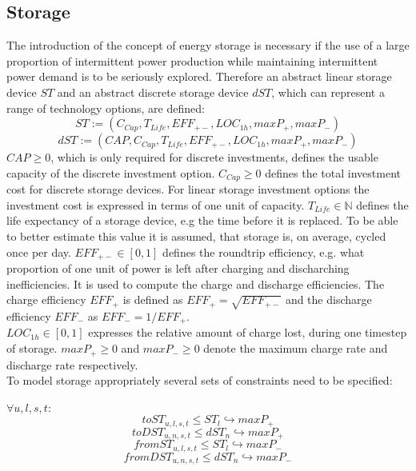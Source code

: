 \documentclass[
	11pt,								%
	DIV10,								%
	a4paper,         					%
	oneside,							%
	headheight=20pt,					%
	footheight=20pt,					%
    parskip=full,						%
    listof=totoc,						%
	bibliography=totoc,					%
	index=totoc,						%
]{scrartcl}
\begin{document}
\subsection{Storage}
The introduction of the concept of energy storage is necessary if the use of a large proportion of intermittent power production while maintaining intermittent power demand is to be seriously explored.
Therefore an abstract linear storage device $ST$ and an abstract discrete storage device $dST$, which can represent a range of technology options, are defined:\\
	\begin{equation}
		ST := (C_{Cap}, T_{Life}, EFF_{+-}, LOC_{1h}, maxP_{+}, maxP_{-})
	\end{equation}
	\begin{equation}
		dST := (CAP, C_{Cap}, T_{Life}, EFF_{+-}, LOC_{1h}, maxP_{+}, maxP_{-})
	\end{equation}
	$CAP \geq 0$, which is only required for discrete investments, defines the usable capacity of the discrete investment option.
	$C_{Cap} \geq 0$ defines the total investment cost for discrete storage devices. For linear storage investment options the investment cost is expressed in terms of one unit of capacity.
	$T_{Life} \in \mathbb{N}$ defines the life expectancy of a storage device, e.g the time before it is replaced. To be able to better estimate this value it is assumed, that storage is, on average, cycled once per day.
	$EFF_{+-} \in [0,1]$ defines the roundtrip efficiency, e.g. what proportion of one unit of power is left after charging and discharching inefficiencies. It is used to compute the charge and discharge efficiencies.
	The charge efficiency $EFF_{+}$ is defined as $EFF_{+} = \sqrt{EFF_{+-}}$ and the discharge efficiency $EFF_{-}$ as $EFF_{-} = 1/EFF_{+}$.\cite{LAUINGER201624}\\
	$LOC_{1h} \in [0,1]$ expresses the relative amount of charge lost, during one timestep of storage.
	$maxP_{+} \geq 0$ and $maxP_{-} \geq 0$ denote the maximum charge rate and discharge rate respectively.
	\\
	To model storage appropriately several sets of constraints need to be specified:
	
	$\forall u,l,s,t $:
	\begin{equation}
		toST_{u,l,s,t} \leq ST_l\hookrightarrow  maxP_{+}
	\end{equation}
	\begin{equation}
		toDST_{u,n,s,t} \leq dST_n\hookrightarrow  maxP_{+}
	\end{equation}
	\begin{equation}
		fromST_{u,l,s,t} \leq ST_l\hookrightarrow  maxP_{-}
	\end{equation}
	\begin{equation}
		fromDST_{u,n,s,t} \leq dST_n\hookrightarrow  maxP_{-}
	\end{equation}
	
\end{document}
